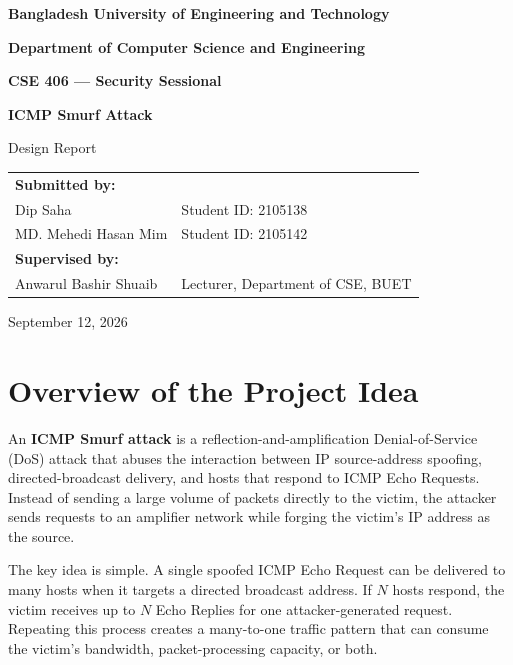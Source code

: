 \documentclass[12pt,a4paper]{article}
\begin{document}
\begin{titlepage}
\centering
\vspace*{1.2in}
{\Large\bfseries Bangladesh University of Engineering and Technology\par}
\vspace{0.25in}
{\large\bfseries Department of Computer Science and Engineering\par}
\vspace{0.9in}
{\Large\bfseries CSE 406 --- Security Sessional\par}
\vspace{0.55in}
{\LARGE\bfseries ICMP Smurf Attack\par}
\vspace{0.2in}
{\Large Design Report\par}
\vspace{0.8in}
\begin{tabular}{ll}
\textbf{Submitted by:} & \\
Dip Saha & Student ID: 2105138\\
MD. Mehedi Hasan Mim & Student ID: 2105142\\[0.4in]
\textbf{Supervised by:} & \\
Anwarul Bashir Shuaib & Lecturer, Department of CSE, BUET
\end{tabular}
\vfill
{\large September 12, 2026\par}
\end{titlepage}
\tableofcontents
\clearpage
{}

\section{Overview of the Project Idea}
An \textbf{ICMP Smurf attack} is a reflection-and-amplification Denial-of-Service (DoS) attack that abuses the interaction between IP source-address spoofing, directed-broadcast delivery, and hosts that respond to ICMP Echo Requests. Instead of sending a large volume of packets directly to the victim, the attacker sends requests to an amplifier network while forging the victim's IP address as the source.

The key idea is simple. A single spoofed ICMP Echo Request can be delivered to many hosts when it targets a directed broadcast address. If $N$ hosts respond, the victim receives up to $N$ Echo Replies for one attacker-generated request. Repeating this process creates a many-to-one traffic pattern that can consume the victim's bandwidth, packet-processing capacity, or both.
\end{document}
